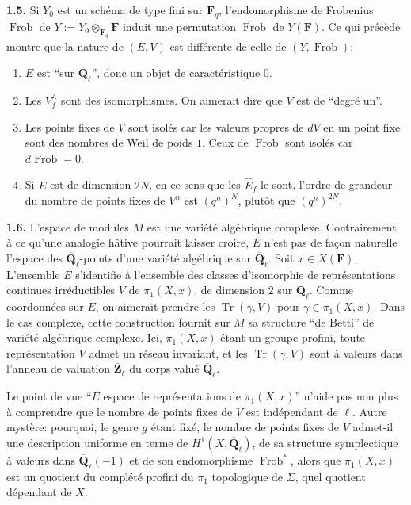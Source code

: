 \documentclass[11pt]{article}
\newcommand{\Fq}{\mathbf{F}_q}
\newcommand{\F}{\mathbf{F}}
\newcommand{\Qbl}{\overline{\mathbf{Q}}_{\ell}}
\newcommand{\Zbl}{\overline{\mathbf{Z}}_{\ell}}
\newcommand{\Frob}{\operatorname{Frob}}
\newcommand{\Tr}{\operatorname{Tr}}
\newcommand{\para}[1]{\medskip\noindent\textbf{#1}\enspace}
\begin{document}
\para{1.5.} Si \(Y_0\) est un schéma de type fini sur \(\Fq\), l'endomorphisme de Frobenius \(\Frob\) de \(Y:=Y_0\otimes_{\Fq}\F\) induit une permutation \(\Frob\) de \(Y(\F)\). Ce qui précède montre que la nature de \((E,V)\) est différente de celle de \((Y,\Frob)\):
\begin{enumerate}[label=(\roman*),leftmargin=2.2em]
\item \(E\) est ``sur \(\Qbl\)'', donc un objet de caractéristique \(0\).
\item Les \(V_f^{\wedge}\) sont des isomorphismes. On aimerait dire que \(V\) est de ``degré un''.
\item Les points fixes de \(V\) sont isolés car les valeurs propres de \(dV\) en un point fixe sont des nombres de Weil de poids \(1\). Ceux de \(\Frob\) sont isolés car \(d\Frob=0\).
\item Si \(E\) est de dimension \(2N\), en ce sens que les \(\widehat{E}_f\) le sont, l'ordre de grandeur du nombre de points fixes de \(V^n\) est \((q^n)^N\), plutôt que \((q^n)^{2N}\).
\end{enumerate}

\para{1.6.} L'espace de modules \(M\) est une variété algébrique complexe. Contrairement à ce qu'une analogie hâtive pourrait laisser croire, \(E\) n'est pas de façon naturelle l'espace des \(\Qbl\)-points d'une variété algébrique sur \(\Qbl\). Soit \(x\in X(\F)\). L'ensemble \(E\) s'identifie à l'ensemble des classes d'isomorphie de représentations continues irréductibles \(V\) de \(\pi_1(X,x)\), de dimension \(2\) sur \(\Qbl\). Comme coordonnées sur \(E\), on aimerait prendre les \(\Tr(\gamma,V)\) pour \(\gamma\in\pi_1(X,x)\). Dans le cas complexe, cette construction fournit sur \(M\) sa structure ``de Betti'' de variété algébrique complexe. Ici, \(\pi_1(X,x)\) étant un groupe profini, toute représentation \(V\) admet un réseau invariant, et les \(\Tr(\gamma,V)\) sont à valeurs dans l'anneau de valuation \(\Zbl\) du corps valué \(\Qbl\).

Le point de vue ``\(E\) espace de représentations de \(\pi_1(X,x)\)'' n'aide pas non plus à comprendre que le nombre de points fixes de \(V\) est indépendant de \(\ell\). Autre mystère: pourquoi, le genre \(g\) étant fixé, le nombre de points fixes de \(V\) admet-il une description uniforme en terme de \(H^1(X,\Qbl)\), de sa structure symplectique à valeurs dans \(\Qbl(-1)\) et de son endomorphisme \(\Frob^*\), alors que \(\pi_1(X,x)\) est un quotient du complété profini du \(\pi_1\) topologique de \(\Sigma\), quel quotient dépendant de \(X\).
\end{document}
